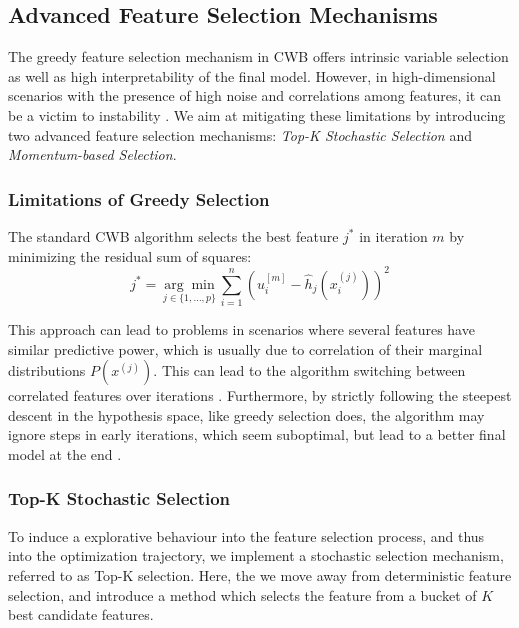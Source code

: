 \documentclass[fontsize=12 pt]{scrartcl}
\begin{document}
\subsection{Advanced Feature Selection Mechanisms}
\label{sec:adv_selection}

The greedy feature selection mechanism in CWB offers intrinsic variable selection as well as high interpretability of the final model. However, in high-dimensional scenarios with the presence of high noise and correlations among features, it can be a victim to instability \citep{Hofner2015}. We aim at mitigating these limitations by introducing two advanced feature selection mechanisms: \textit{Top-K Stochastic Selection} and \textit{Momentum-based Selection}.

\subsubsection{Limitations of Greedy Selection}

The standard CWB algorithm selects the best feature $j^*$ in iteration $m$ by minimizing the residual sum of squares:
\begin{equation}
    j^* = \underset{j \in \{1, \dots, p\}}{\arg \min} \sum_{i=1}^n \left( u_i^{[m]} - \hat{h}_j(x_i^{(j)}) \right)^2
\end{equation}

This approach can lead to problems in scenarios where several features have similar predictive power, which is usually due to correlation of their marginal distributions $P(x^{(j)})$. This can lead to the algorithm switching between correlated features over iterations \citep{Hofner2015}. Furthermore, by strictly following the steepest descent in the hypothesis space, like greedy selection does, the algorithm may ignore steps in early iterations, which seem suboptimal, but lead to a better final model at the end \citep{efron2004least, hastie2009elements}.

\subsubsection{Top-K Stochastic Selection}
\label{sec:topk}

To induce a explorative behaviour into the feature selection process, and thus into the optimization trajectory, we implement a stochastic selection mechanism, referred to as Top-K selection. Here, the we move away from deterministic feature selection, and introduce a method which selects the feature from a bucket of $K$ best candidate features.
\end{document}
